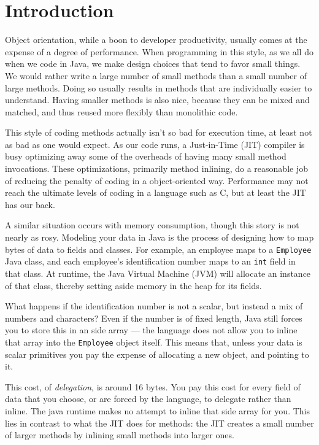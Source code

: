 
\chapter{Introduction}
\label{chapter:introduction}

Object orientation, while a boon to developer productivity, usually comes at the
expense of a degree of performance. When programming in this style, as we all do
when we code in Java, we make design choices that tend to favor small things.
We would rather write a large number of small methods than a small number of
large methods. Doing so usually results in methods that are individually easier
to understand. Having smaller methods is also nice, because they can be mixed
and matched, and thus reused more flexibly than monolithic code.

This style of coding methods actually isn't so bad for execution time, at least
not as bad as one would expect. As our code runs, a Just-in-Time (JIT) compiler
is busy optimizing away some of the overheads of having many small method
invocations. These optimizations, primarily method inlining, do a reasonable job
of reducing the penalty of coding in a object-oriented way. Performance may not
reach the ultimate levels of coding in a language such as C, but at least the
JIT has our back.

A similar situation occurs with memory consumption, though this story is not
nearly as rosy.
Modeling your data in Java is the process of designing how to map bytes of data
to fields and classes.
For example, an employee maps to a \texttt{Employee} Java class, and each
employee's identification number maps to an \texttt{int} field in that class. At
runtime, the Java Virtual Machine (JVM) will allocate an instance of that class,
thereby setting aside memory in the heap for its fields.

What happens if the identification number is not a scalar, but instead a mix of
numbers and characters? Even if the number is of fixed length, Java still forces
you to store this in an side array --- the language does not allow you to inline
that array into the \texttt{Employee} object itself. This means that, unless
your data is scalar primitives you pay the expense of allocating a new object,
and pointing to it. 

This cost, of \emph{delegation}, is around 16 bytes. You pay this cost for every
field of data that you choose, or are forced by the language, to delegate rather
than inline. The java runtime makes no attempt to inline that side array
for you. This lies in contrast to what the JIT does for methods: the JIT creates a
small number of larger methods by inlining small methods into larger ones.

